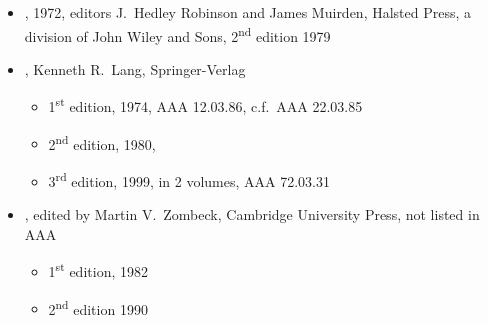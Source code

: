 \begin{itemize}
\item {}, 1972, editors J.\ Hedley Robinson and
  James Muirden, Halsted Press, a division of John Wiley and Sons,
  2\textsuperscript{nd} edition 1979

\item {}, Kenneth R.\ Lang, Springer-Verlag
  \begin{itemize}
  \item 1\textsuperscript{st} edition, 1974, AAA 12.03.86, c.f.\ AAA 22.03.85
  \item 2\textsuperscript{nd} edition, 1980,
  \item 3\textsuperscript{rd} edition, 1999, in 2 volumes, AAA 72.03.31
  \end{itemize}
  
\item {}, edited by
  Martin V.\ Zombeck, Cambridge University Press, not listed in AAA
  \begin{itemize}
  \item 1\textsuperscript{st} edition, 1982
  \item 2\textsuperscript{nd} edition 1990
  \end{itemize}
  
\end{itemize}


